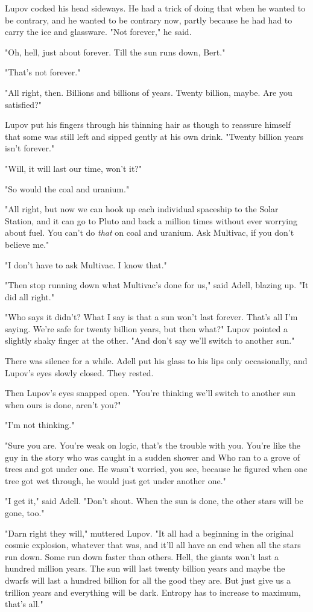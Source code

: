 \documentclass[11pt,twocolumn,paper=a5,pagesize]{article}
\begin{document}
Lupov cocked his head sideways. He had a trick of doing that when he wanted to be contrary, and he wanted to be contrary now, partly because he had had to carry the ice and glassware. "Not forever," he said.

"Oh, hell, just about forever. Till the sun runs down, Bert."

"That's not forever."

"All right, then. Billions and billions of years. Twenty billion, maybe. Are you satisfied?"

Lupov put his fingers through his thinning hair as though to reassure himself that some was still left and sipped gently at his own drink. "Twenty billion years isn't forever."

"Will, it will last our time, won't it?"

"So would the coal and uranium."

"All right, but now we can hook up each individual spaceship to the Solar Station, and it can go to Pluto and back a million times without ever worrying about fuel. You can't do \textit{that} on coal and uranium. Ask Multivac, if you don't believe me."

"I don't have to ask Multivac. I know that."

"Then stop running down what Multivac's done for us," said Adell, blazing up. "It did all right."

"Who says it didn't? What I say is that a sun won't last forever. That's all I'm saying. We're safe for twenty billion years, but then what?" Lupov pointed a slightly shaky finger at the other. "And don't say we'll switch to another sun."

There was silence for a while. Adell put his glass to his lips only occasionally, and Lupov's eyes slowly closed. They rested.

Then Lupov's eyes snapped open. "You're thinking we'll switch to another sun when ours is done, aren't you?"

"I'm not thinking."

"Sure you are. You're weak on logic, that's the trouble with you. You're like the guy in the story who was caught in a sudden shower and Who ran to a grove of trees and got under one. He wasn't worried, you see, because he figured when one tree got wet through, he would just get under another one."

"I get it," said Adell. "Don't shout. When the sun is done, the other stars will be gone, too."

"Darn right they will," muttered Lupov. "It all had a beginning in the original cosmic explosion, whatever that was, and it'll all have an end when all the stars run down. Some run down faster than others. Hell, the giants won't last a hundred million years. The sun will last twenty billion years and maybe the dwarfs will last a hundred billion for all the good they are. But just give us a trillion years and everything will be dark. Entropy has to increase to maximum, that's all."
\end{document}
